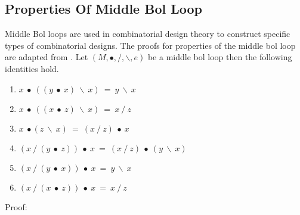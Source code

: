 \subsection{Properties Of Middle Bol Loop}
Middle Bol loops are used in combinatorial design theory to construct specific
types of combinatorial designs. The proofs for properties of the middle bol loop are
adapted from \cite{jaiyeola2021new}. Let $(M, ∙, /, \backslash, e)$ be a middle bol loop then the
following identities hold.
\begin{enumerate}
\item \(x\ ∙\ ((y\ ∙\ x)\ \backslash \ x)\ =\ y\ \backslash\ x\) 
\item \(x\ ∙\ ((x\ ∙\ z)\ \backslash \ x)\ =\ x\ /\ z\)
\item \(x\ ∙ (z\ \backslash\ x)\ =\ (x\ /\ z)\ ∙\ x\)
\item \((x\ /\ (y\ ∙\ z))\ ∙\ x\ =\ (x\ /\ z)\ ∙\ (y\ \backslash\ x)\)
\item \((x\ /\ (y\ ∙\ x))\ ∙\ x\ =\ y\ \backslash \ x\)
\item \((x\ /\ (x\ ∙\ z))\ ∙\ x\ = \ x\ /\  z\)
\end{enumerate}
Proof:
